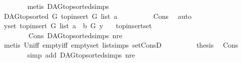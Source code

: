 \begin{isabellebody}
\ \ \ \ \ \ \isamarkupfalse%
\ {\isacharparenleft}{\kern0pt}metis\ DAG{\isachardot}{\kern0pt}top{\isacharunderscore}{\kern0pt}sorted{\isachardot}{\kern0pt}simps{\isacharparenleft}{\kern0pt}{}{\isacharparenright}{\kern0pt}{\isacharparenright}{\kern0pt}\ \isanewline
\ \ \ \ \isamarkupfalse%
\ \isamarkupfalse%
\ {\isachardoublequoteopen}DAG{\isachardot}{\kern0pt}top{\isacharunderscore}{\kern0pt}sorted\ G\ {\isacharparenleft}{\kern0pt}top{\isacharunderscore}{\kern0pt}insert\ G\ list\ a{\isacharparenright}{\kern0pt}{\isachardoublequoteclose}\ \isanewline
\ \ \ \ \ \ \isamarkupfalse%
\ \ Cons{\isacharparenleft}{\kern0pt}{}{\isacharcomma}{\kern0pt}{}{\isacharparenright}{\kern0pt}\ \isamarkupfalse%
\ auto\isanewline
\ \ \ \ \isamarkupfalse%
\ \isamarkupfalse%
\ {\isachardoublequoteopen}{\isacharparenleft}{\kern0pt}{\isasymforall}y{\isasymin}set\ {\isacharparenleft}{\kern0pt}top{\isacharunderscore}{\kern0pt}insert\ G\ list\ a{\isacharparenright}{\kern0pt}{\isachardot}{\kern0pt}\ {\isasymnot}\ b\ {\isasymrightarrow}\isactrlsup {\isacharplus}{\kern0pt}\isactrlbsub G\isactrlesub \ y\ {\isacharparenright}{\kern0pt}{\isachardoublequoteclose}\ \isamarkupfalse%
\ top{\isacharunderscore}{\kern0pt}insert{\isacharunderscore}{\kern0pt}set\ \isanewline
\ \ \ \ \ \ \ \ Cons\ DAG{\isachardot}{\kern0pt}top{\isacharunderscore}{\kern0pt}sorted{\isachardot}{\kern0pt}simps{\isacharparenleft}{\kern0pt}{}{\isacharparenright}{\kern0pt}\ nre\isanewline
\ \ \ \ \ \ \isamarkupfalse%
\ {\isacharparenleft}{\kern0pt}metis\ Un{\isacharunderscore}{\kern0pt}iff\ empty{\isacharunderscore}{\kern0pt}iff\ empty{\isacharunderscore}{\kern0pt}set\ list{\isachardot}{\kern0pt}simps{\isacharparenleft}{\kern0pt}{}{}{\isacharparenright}{\kern0pt}\ set{\isacharunderscore}{\kern0pt}ConsD{\isacharparenright}{\kern0pt}\ \ \isanewline
\ \ \ \ \isamarkupfalse%
\ \isamarkupfalse%
\ {\isacharquery}{\kern0pt}thesis\ \isamarkupfalse%
\ Cons{\isacharparenleft}{\kern0pt}{}{\isacharparenright}{\kern0pt}\isanewline
\ \ \ \ \ \ \isamarkupfalse%
\ {\isacharparenleft}{\kern0pt}simp\ add{\isacharcolon}{\kern0pt}\ DAG{\isachardot}{\kern0pt}top{\isacharunderscore}{\kern0pt}sorted{\isachardot}{\kern0pt}simps{\isacharparenleft}{\kern0pt}{}{\isacharparenright}{\kern0pt}\ nre{\isacharparenright}{\kern0pt}\ \ \isanewline

\end{isabellebody}
